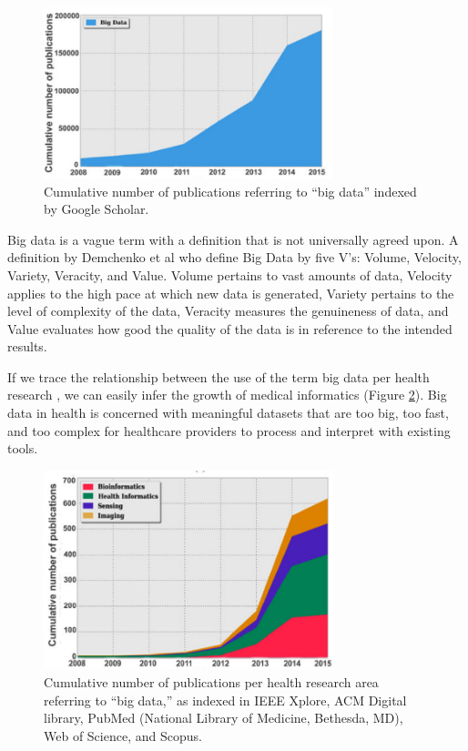 \begin{figure}[h!]
    \center
    \includegraphics[width=0.75\textwidth]{images/chapter1/publication_big_data.PNG}
    \caption{Cumulative number of publications referring to “big data” indexed by Google Scholar.}
    \label{fig:bigDataGoogleScholar}
  \end{figure}
 
Big data is a vague term with a definition that is not universally agreed upon. A definition by Demchenko et al\cite{demchenko2012addressing} who define Big Data by five V’s: Volume, Velocity, Variety, Veracity, and Value. Volume pertains to vast amounts of data, Velocity applies to the high pace at which new data is generated, Variety pertains to the level of complexity of the data, Veracity measures the genuineness of data, and Value evaluates how good the quality of the data is in reference to the intended results.


If we trace the relationship between the use of the term big data per health research , we can easily infer the growth of medical informatics (Figure \ref{fig:bigDataHealthResearch}). Big data in health is concerned with meaningful datasets that are too big, too fast, and too complex for healthcare providers to process and interpret with existing tools\cite{andreu2015big}.
\begin{figure}[h!]
    \center
    \includegraphics[width=0.75\textwidth]{images/chapter1/health_publication_bigData.PNG}
    \caption{Cumulative number of publications per health research
    area referring to “big data,” as indexed in IEEE Xplore, ACM Digital library, PubMed (National Library of Medicine, Bethesda, MD), Web of Science, and Scopus.}
    \label{fig:bigDataHealthResearch}
  \end{figure}

